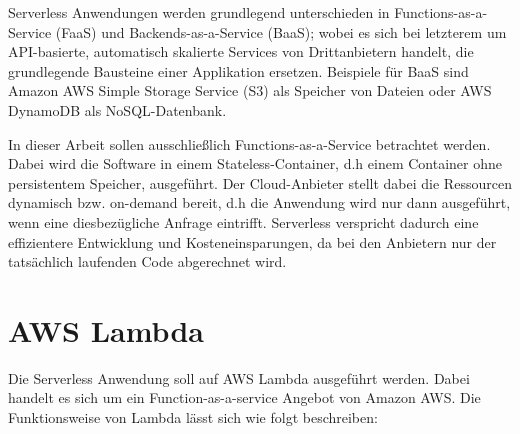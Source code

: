 Serverless Anwendungen werden grundlegend unterschieden in Functions-as-a-Service (FaaS) und Backends-as-a-Service (BaaS); wobei es sich bei letzterem um API-basierte, automatisch skalierte Services von Drittanbietern handelt, die grundlegende Bausteine einer Applikation ersetzen\cite{ken_owens_cncf_2018}. Beispiele für BaaS sind Amazon AWS Simple Storage Service (S3) als Speicher von Dateien oder AWS DynamoDB als NoSQL-Datenbank.

In dieser Arbeit sollen ausschließlich Functions-as-a-Service betrachtet werden. Dabei wird die Software in einem Stateless-Container, d.h einem Container ohne persistentem Speicher, ausgeführt. Der Cloud-Anbieter stellt dabei die Ressourcen dynamisch bzw. on-demand bereit, d.h die Anwendung wird nur dann ausgeführt, wenn eine diesbezügliche Anfrage eintrifft. Serverless verspricht dadurch eine effizientere Entwicklung und Kosteneinsparungen, da bei den Anbietern nur der tatsächlich laufenden Code abgerechnet wird\cite{noauthor_was_2016}.

\section{AWS Lambda}
Die Serverless Anwendung soll auf AWS Lambda ausgeführt werden. Dabei handelt es sich um ein Function-as-a-service Angebot von Amazon AWS. Die Funktionsweise von Lambda lässt sich wie folgt beschreiben\cite{amazon_aws_aws_2020}:

